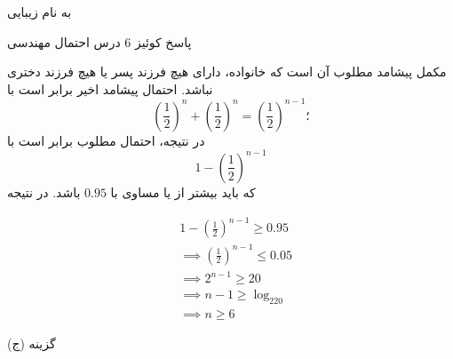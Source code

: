 \documentclass{article}
\newcommand{\eqn}[1]{
\[\begin{split}
#1
\end{split}\]
}
\begin{document}
\LARGE
\begin{center}

به نام زیبایی


پاسخ کوئیز 6 درس احتمال مهندسی

\end{center}
\hrulefill
\large


مکمل پیشامد مطلوب آن است که خانواده، دارای هیچ فرزند پسر یا هیچ فرزند دختری نباشد. احتمال پیشامد اخیر برابر است با
$$
(\frac{1}{2})^n+(\frac{1}{2})^n=(\frac{1}{2})^{n-1}؛
$$
در نتیجه، احتمال مطلوب برابر است با
$$
1-(\frac{1}{2})^{n-1}
$$
که باید بیشتر از یا مساوی با $0.95$ باشد. در نتیجه
\eqn{
&1-(\frac{1}{2})^{n-1}\ge 0.95
\\&\implies
(\frac{1}{2})^{n-1}\le 0.05
\\&\implies
2^{n-1}\ge 20
\\&\implies
n-1\ge \log_220
\\&\implies
n\ge 6
}{}

گزینه (ج)
\end{document}
